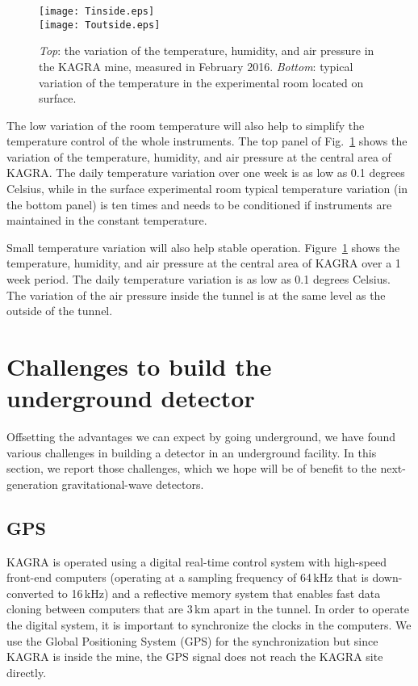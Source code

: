 \documentclass[prd ,twocolumn ,secnumarabic,dvips
,amssymb, amsmath,nobibnotes, aps, prd,superscriptaddress]{revtex4-1}
\begin{document}
{\begin{figure}[htbp]
\centering
		\texttt{[image: Tinside.eps]}\\
\hspace{-0.7cm}
		\texttt{[image: Toutside.eps]}
		\caption{\label{fig:ArayaData}{\it Top}: the variation of the temperature, humidity, and air pressure in the KAGRA mine, measured in February 2016. {\it Bottom}: typical variation of the temperature in the experimental room located on surface.}
\end{figure}

The low variation of the room temperature will also help to simplify the temperature control of the whole instruments. The top panel of Fig.~\ref{fig:ArayaData} shows the variation of the temperature, humidity, and air pressure at the central area of KAGRA. The daily temperature variation over one week is as low as 0.1 degrees Celsius, while in the surface experimental room typical temperature variation (in the bottom panel) is ten times and needs to be conditioned if instruments are maintained in the constant temperature.


Small temperature variation will also help stable operation. Figure~\ref{fig:ArayaData} shows the temperature, humidity, and air pressure at the central area of KAGRA over a 1 week period. The daily temperature variation is as low as 0.1 degrees Celsius. The variation of the air pressure inside the tunnel is at the same level as the outside of the tunnel.


\section{Challenges to build the underground detector}\label{sec:4}
Offsetting the advantages we can expect by going underground, we have found various challenges in building a detector in an underground facility. In this section, we report those challenges, which we hope will be of benefit to the next-generation gravitational-wave detectors.

\subsection{GPS}
%
KAGRA is operated using a digital real-time control system with high-speed 
front-end computers (operating at a sampling frequency of 64\,kHz that is down-converted to 16\,kHz) and a reflective memory system that enables fast data cloning between computers that are 3\,km apart in the tunnel. In order to operate the digital system, it is important to synchronize the clocks in the computers. We use the Global Positioning System (GPS) for the synchronization but since KAGRA is inside the mine, the GPS signal does not reach the KAGRA site directly.

}
\end{document}
